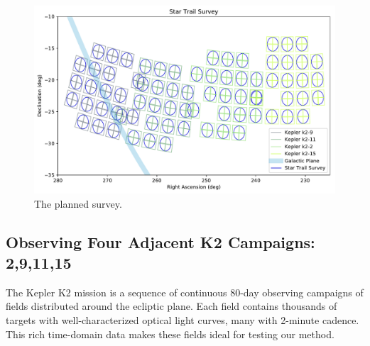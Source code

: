 \documentclass[11pt]{article}
\begin{document}
\begin{figure}[htb]
\center
\includegraphics[scale=0.7]{survey.pdf}
\caption{The planned survey.}
\label{fig:3}
\end{figure}


\clearpage

%

%

\expdesign
\subsection*{Observing Four Adjacent K2 Campaigns: 2,9,11,15}

The Kepler K2 mission is a sequence of continuous 80-day observing campaigns of fields distributed around the ecliptic plane. Each field contains thousands of targets with well-characterized optical light curves, many with 2-minute cadence. This rich time-domain data makes these fields ideal for testing our method.

\end{document}
